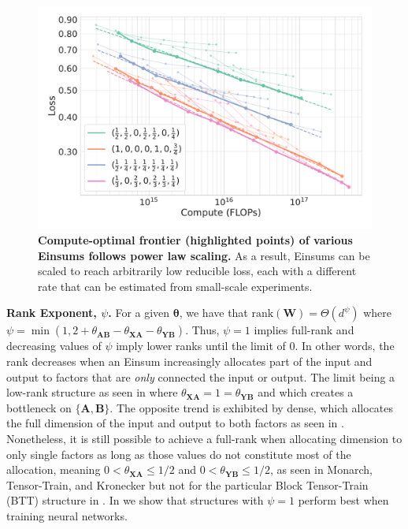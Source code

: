 \documentclass{article}
\newcommand{\mbf}[1]{{\boldsymbol{\mathbf{#1}}}}
\newcommand{\bm}{\mbf}
\newcommand{\set}[1]{\{#1\}}
\begin{document}
\begin{figure}
\includegraphics[scale=0.25]{figs/vecs_gpt2_smallvocab.pdf}
\vspace{-3mm}
\caption{\footnotesize \textbf{Compute-optimal frontier (highlighted points) of various Einsums follows power law scaling.} As a result, Einsums can be scaled to reach arbitrarily low reducible loss, each with a different rate that can be estimated from small-scale experiments.}
\vspace{-3mm}
\label{fig:einsums_power_law}
\end{figure}

\noindent \textbf{Rank Exponent, $\psi$.} \quad
For a given $\bm{\theta}$, we have that $\text{rank}(\bm{W}) = \Theta\left(d^{\psi}\right)$
where $\psi=\min(1, 2 + \theta_{\bm{A}\bm{B}} - \theta_{\bm{X} \bm{A}} - \theta_{\bm{Y} \bm{B}})$.
Thus, $\psi=1$ implies full-rank and decreasing values of $\psi$ imply lower ranks until the limit of $0$.
In other words, the rank decreases when an Einsum increasingly allocates part of the input and output to factors that are \emph{only} connected the input or output.
The limit being a low-rank structure as seen in  where $\theta_{\bm{X}\bm{A}}=1=\theta_{\bm{Y}\bm{B}}$ and which creates a bottleneck on $\set{\bm{A}, \bm{B}}$.
The opposite trend is exhibited by dense, which allocates the full dimension of the input and output to both factors as seen in .
Nonetheless, it is still possible to achieve a full-rank when allocating dimension to only single factors as long as those values
do not constitute most of the allocation, meaning $0<\theta_{\bm{X}\bm{A}} \leq 1/2$ and $0<\theta_{\bm{Y} \bm{B}} \leq 1/2$,
as seen in Monarch, Tensor-Train, and Kronecker but not for the particular Block Tensor-Train (BTT) structure \citep{qiu2024compute} in .
In  we show that structures with $\psi=1$ perform best when training neural networks.
\end{document}
